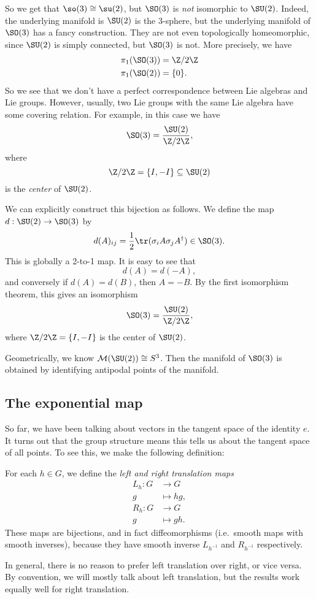 \documentclass[a4paper]{article}
\begin{document}
So we get that $\so(3) \cong \su(2)$, but $\SO(3)$ is \emph{not} isomorphic to $\SU(2)$. Indeed, the underlying manifold is $\SU(2)$ is the $3$-sphere, but the underlying manifold of $\SO(3)$ has a fancy construction. They are not even topologically homeomorphic, since $\SU(2)$ is simply connected, but $\SO(3)$ is not. More precisely, we have
\begin{align*}
  \pi_1(\SO(3)) &= \Z/2\Z\\
  \pi_1(\SO(2)) &= \{0\}.
\end{align*}
So we see that we don't have a perfect correspondence between Lie algebras and Lie groups. However, usually, two Lie groups with the same Lie algebra have some covering relation. For example, in this case we have
\[
  \SO(3) = \frac{\SU(2)}{\Z/2\Z},
\]
where
\[
  \Z/2\Z = \{I, -I\} \subseteq \SU(2)
\]
is the \emph{center} of $\SU(2)$.

We can explicitly construct this bijection as follows. We define the map $d: \SU(2) \to \SO(3)$ by
\[
  d(A)_{ij} = \frac{1}{2} \tr (\sigma_i A\sigma_j A^\dagger) \in \SO(3).
\]
This is globally a 2-to-1 map. It is easy to see that
\[
  d(A) = d(-A),
\]
and conversely if $d(A) = d(B)$, then $A = -B$. By the first isomorphism theorem, this gives an isomorphism
\[
  \SO(3) = \frac{\SU(2)}{\Z/2\Z},
\]
where $\Z/2\Z = \{I, -I\}$ is the center of $\SU(2)$.

Geometrically, we know $\mathcal{M}(\SU(2)) \cong S^3$. Then the manifold of $\SO(3)$ is obtained by identifying antipodal points of the manifold.

\subsection{The exponential map}
So far, we have been talking about vectors in the tangent space of the identity $e$. It turns out that the group structure means this tells us about the tangent space of all points. To see this, we make the following definition:

\begin{defi}
  For each $h \in G$, we define the \emph{left and right translation maps}
  \begin{align*}
    L_h: G &\to G\\
    g &\mapsto hg,\\
    R_h: G &\to G\\
    g &\mapsto gh.
  \end{align*}
  These maps are bijections, and in fact diffeomorphisms (i.e.\ smooth maps with smooth inverses), because they have smooth inverse $L_{h^{-1}}$ and $R_{h^{-1}}$ respectively.
\end{defi}
In general, there is no reason to prefer left translation over right, or vice versa. By convention, we will mostly talk about left translation, but the results work equally well for right translation.
\end{document}
